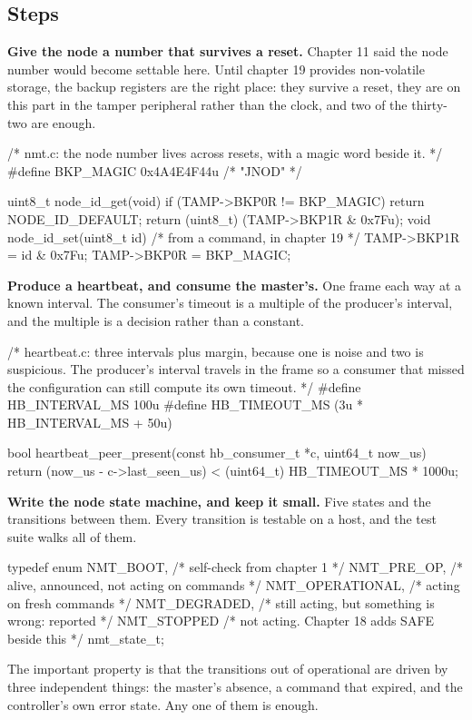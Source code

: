 \subsection*{Steps}

\begin{steps}
\item \textbf{Give the node a number that survives a reset.} Chapter 11 said the
node number would become settable here. Until chapter 19 provides non-volatile
storage, the backup registers are the right place: they survive a reset, they
are on this part in the tamper peripheral rather than the clock, and two of the
thirty-two are enough.
\begin{ccode}
/* nmt.c: the node number lives across resets, with a magic word beside it. */
#define BKP_MAGIC  0x4A4E4F44u          /* "JNOD" */

uint8_t node_id_get(void)
{
    if (TAMP->BKP0R != BKP_MAGIC) return NODE_ID_DEFAULT;
    return (uint8_t) (TAMP->BKP1R & 0x7Fu);
}
void node_id_set(uint8_t id)            /* from a command, in chapter 19 */
{
    TAMP->BKP1R = id & 0x7Fu;  TAMP->BKP0R = BKP_MAGIC;
}
\end{ccode}

\item \textbf{Produce a heartbeat, and consume the master's.} One frame each way
at a known interval. The consumer's timeout is a multiple of the producer's
interval, and the multiple is a decision rather than a constant.
\begin{ccode}
/* heartbeat.c: three intervals plus margin, because one is noise and two is
   suspicious. The producer's interval travels in the frame so a consumer
   that missed the configuration can still compute its own timeout. */
#define HB_INTERVAL_MS   100u
#define HB_TIMEOUT_MS    (3u * HB_INTERVAL_MS + 50u)

bool heartbeat_peer_present(const hb_consumer_t *c, uint64_t now_us)
{
    return (now_us - c->last_seen_us) < (uint64_t) HB_TIMEOUT_MS * 1000u;
}
\end{ccode}

\item \textbf{Write the node state machine, and keep it small.} Five states and
the transitions between them. Every transition is testable on a host, and the
test suite walks all of them.
\begin{ccode}
typedef enum {
    NMT_BOOT,          /* self-check from chapter 1 */
    NMT_PRE_OP,        /* alive, announced, not acting on commands */
    NMT_OPERATIONAL,   /* acting on fresh commands */
    NMT_DEGRADED,      /* still acting, but something is wrong: reported */
    NMT_STOPPED        /* not acting. Chapter 18 adds SAFE beside this */
} nmt_state_t;
\end{ccode}
The important property is that the transitions out of operational are driven by
three independent things: the master's absence, a command that expired, and the
controller's own error state. Any one of them is enough.


\end{steps}
